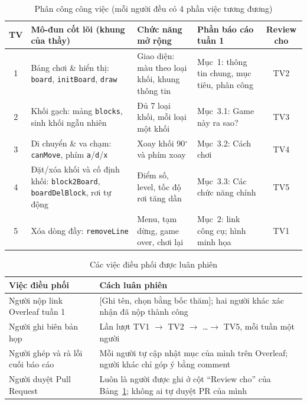 \documentclass[13pt,a4paper]{extarticle}
\newcommand{\todo}[1]{\textcolor{todored}{[#1]}}
\begin{document}
\begin{table}[H]
\centering\small
\begin{tabularx}{\linewidth}{@{}c X X X c@{}}
\toprule
\textbf{TV} & \textbf{Mô-đun cốt lõi (khung của thầy)} & \textbf{Chức năng mở rộng} & \textbf{Phần báo cáo tuần 1} & \textbf{Review cho}\\
\midrule
1 & Bảng chơi \& hiển thị: \texttt{board}, \texttt{initBoard}, \texttt{draw} & Giao diện: màu theo loại khối, khung thông tin & Mục~1: thông tin chung, mục tiêu, phân công & TV2\\
2 & Khối gạch: mảng \texttt{blocks}, sinh khối ngẫu nhiên & Đủ 7 loại khối, mỗi loại một khối & Mục~3.1: Game này ra sao? & TV3\\
3 & Di chuyển \& va chạm: \texttt{canMove}, phím \texttt{a}/\texttt{d}/\texttt{x} & Xoay khối 90$^\circ$ và phím xoay & Mục~3.2: Cách chơi & TV4\\
4 & Đặt/xóa khối và cố định khối: \texttt{block2Board}, \texttt{boardDelBlock}, rơi tự động & Điểm số, level, tốc độ rơi tăng dần & Mục~3.3: Các chức năng chính & TV5\\
5 & Xóa dòng đầy: \texttt{removeLine} & Menu, tạm dừng, game over, chơi lại & Mục~2: link công cụ; hình minh họa & TV1\\
\bottomrule
\end{tabularx}
\caption{Phân công công việc (mỗi người đều có 4 phần việc tương đương)}
\label{tab:phancong}
\end{table}

\begin{table}[H]
\centering\small
\begin{tabularx}{\linewidth}{@{}X X@{}}
\toprule
\textbf{Việc điều phối} & \textbf{Cách luân phiên}\\
\midrule
Người nộp link Overleaf tuần 1 & \todo{Ghi tên, chọn bằng bốc thăm}; hai người khác xác nhận đã nộp thành công\\
Người ghi biên bản họp & Lần lượt TV1 $\to$ TV2 $\to$ \ldots $\to$ TV5, mỗi tuần một người\\
Người ghép và rà lỗi cuối báo cáo & Mỗi người tự cập nhật mục của mình trên Overleaf; người khác chỉ góp ý bằng comment\\
Người duyệt Pull Request & Luôn là người được ghi ở cột ``Review cho'' của Bảng~\ref{tab:phancong}; không ai tự duyệt PR của mình\\
\bottomrule
\end{tabularx}
\caption{Các việc điều phối được luân phiên}
\label{tab:luanphien}
\end{table}
\end{document}
